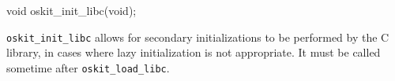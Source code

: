 %
\begin{apisyn}
        \funcproto void oskit_init_libc(void);
\end{apisyn}
\begin{apidesc}
	\texttt{oskit_init_libc} allows for secondary initializations to be
	performed by the C library, in cases where lazy initialization is
	not appropriate. It must be called sometime after
	\texttt{oskit_load_libc}.
\end{apidesc}
